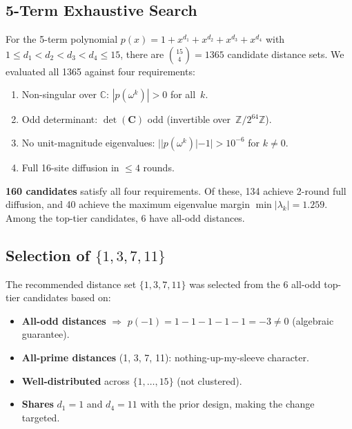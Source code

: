 \documentclass[runningheads]{llncs}
\newcommand{\Ztwo}{\mathbb{Z}/2^{64}\mathbb{Z}}
\newcommand{\coupmat}{\mathbf{C}}
\begin{document}
\subsection{5-Term Exhaustive Search}

For the 5-term polynomial $p(x) = 1 + x^{d_1} + x^{d_2} + x^{d_3} + x^{d_4}$
with $1 \leq d_1 < d_2 < d_3 < d_4 \leq 15$, there are $\binom{15}{4} = 1365$
candidate distance sets.  We evaluated all 1365 against four requirements:

\begin{enumerate}[nosep,label=R\arabic*.]
\item Non-singular over $\mathbb{C}$: $|p(\omega^k)| > 0$ for all~$k$.
\item Odd determinant: $\det(\coupmat)$ odd (invertible over~$\Ztwo$).
\item No unit-magnitude eigenvalues: $||p(\omega^k)| - 1| > 10^{-6}$ for $k \neq 0$.
\item Full 16-site diffusion in $\leq 4$ rounds.
\end{enumerate}

\textbf{160 candidates} satisfy all four requirements.  Of these, 134 achieve
2-round full diffusion, and 40 achieve the maximum eigenvalue margin
$\min|\lambda_k| = 1.259$.  Among the top-tier candidates, 6 have all-odd
distances.

\subsection{Selection of \texorpdfstring{$\{1,3,7,11\}$}{1,3,7,11}}

The recommended distance set $\{1,3,7,11\}$ was selected from the 6 all-odd
top-tier candidates based on:
\begin{itemize}[nosep]
\item \textbf{All-odd distances} $\Rightarrow$ $p(-1) = 1-1-1-1-1 = -3 \neq 0$
  (algebraic guarantee).
\item \textbf{All-prime distances} (1, 3, 7, 11): nothing-up-my-sleeve character.
\item \textbf{Well-distributed} across $\{1, \ldots, 15\}$ (not clustered).
\item \textbf{Shares} $d_1 = 1$ and $d_4 = 11$ with the prior design, making the
  change targeted.
\end{itemize}
\end{document}

